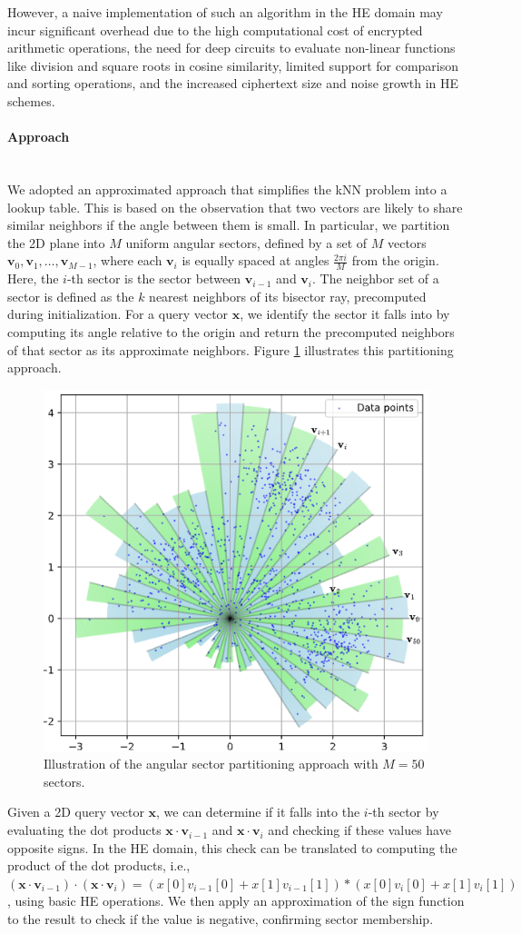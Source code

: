 \documentclass[article]{iacrtrans}
\begin{document}
However, a naive implementation of such an algorithm in the HE domain may incur significant overhead due to the high computational cost of encrypted arithmetic operations, the need for deep circuits to evaluate non-linear functions like division and square roots in cosine similarity, limited support for comparison and sorting operations, and the increased ciphertext size and noise growth in HE schemes.

\paragraph{Approach}\mbox{}\\

We adopted an approximated approach that simplifies the kNN problem into a lookup table. This is based on the observation that two vectors are likely to share similar neighbors if the angle between them is small. In particular, we partition the 2D plane into $M$ uniform angular sectors, defined by a set of $M$ vectors ${\mathbf{v}_0, \mathbf{v}_1, \dots, \mathbf{v}_{M-1}}$, where each $\mathbf{v}_i$ is equally spaced at angles $\frac{2\pi i}{M}$ from the origin. Here, the $i$-th sector is the sector between $\mathbf{v}_{i-1}$ and $\mathbf{v}_i$. The neighbor set of a sector is defined as the $k$ nearest neighbors of its bisector ray, precomputed during initialization. For a query vector $\mathbf{x}$, we identify the sector it falls into by computing its angle relative to the origin and return the precomputed neighbors of that sector as its approximate neighbors. Figure \ref{fig:angular-section} illustrates this partitioning approach.

\begin{figure}
    \centering
    \includegraphics[width=0.5\linewidth]{figures_knn/angular_section.png}
    \caption{Illustration of the angular sector partitioning approach with $M=50$ sectors.}
    \label{fig:angular-section}
\end{figure}
Given a 2D query vector $\mathbf{x}$, we can determine if it falls into the $i$-th sector by evaluating the dot products $\mathbf{x} \cdot \mathbf{v}_{i-1}$ and $\mathbf{x} \cdot \mathbf{v}_i$ and checking if these values have opposite signs. In the HE domain, this check can be translated to computing the product of the dot products, i.e., $(\mathbf{x} \cdot \mathbf{v}_{i-1}) \cdot (\mathbf{x} \cdot \mathbf{v}_i) = (x[0]v_{i-1}[0] + x[1]v_{i-1}[1]) * (x[0]v_i[0] + x[1]v_i[1])$, using basic HE operations. We then apply an approximation of the sign function to the result to check if the value is negative, confirming sector membership.
\end{document}
